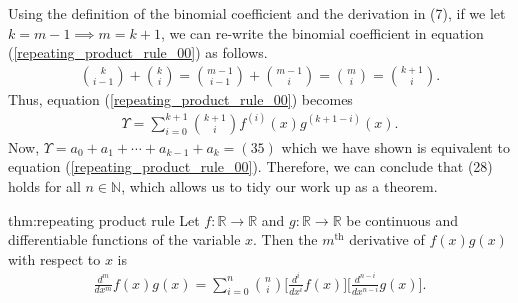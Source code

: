 Using the definition of the binomial coefficient and the derivation in (7), if we let $k=m-1 \implies m=k+1$, we can re-write the binomial coefficient in equation (\ref{repeating_product_rule_00}) as follows.
\begin{align}
	{{k}\choose{i-1}}+{{k}\choose{i}}={{m-1}\choose{i-1}}+{{m-1}\choose{i}}={{m}\choose{i}}={{k+1}\choose{i}}.
\end{align}
Thus, equation (\ref{repeating_product_rule_00}) becomes
\begin{align}
	\Upsilon=\sum_{i=0}^{k+1}{{k+1}\choose{i}}f^{(i)}(x)g^{(k+1-i)}(x).
\end{align}
Now, $\Upsilon=a_0+a_1+\cdots+a_{k-1}+a_k=(35)$ which we have shown is equivalent to equation (\ref{repeating_product_rule_00}). Therefore, we can conclude that (28) holds for all $n\in\mathbb{N}$, which allows us to tidy our work up as a theorem.
\begin{theo}{thm:repeating product rule}
	Let $f:\mathbb{R}\rightarrow\mathbb{R}$ and $g:\mathbb{R}\rightarrow\mathbb{R}$ be continuous and differentiable functions of the variable $x$. Then the $m^{\textrm{th}}$ derivative of $f(x)g(x)$ with respect to $x$ is
	\begin{align*}
		\frac{d^m}{dx^m}f(x)g(x)=\sum_{i=0}^{n}{{n}\choose{i}}\bigg[\frac{d^i}{dx^i}f(x) \bigg]\bigg[\frac{d^{n-i}}{dx^{n-i}}g(x) \bigg].
	\end{align*}
\end{theo}



